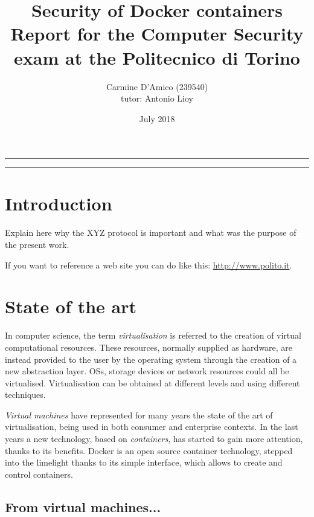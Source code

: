\documentclass[a4paper,12pt]{article}
\begin{document}
\title{Security of Docker containers \\
{\normalsize Report for the Computer Security exam at the Politecnico di Torino}
} \author{Carmine D'Amico (239540) \\
{\normalsize tutor: Antonio Lioy} }
\date{July 2018}
\maketitle

\vfill

\rule{\textwidth}{1pt}

\tableofcontents

\rule{\textwidth}{1pt}

\vfill

\newpage

\section{Introduction}

Explain here why the XYZ protocol is important and what was the purpose of the
present work.

If you want to reference a web site you can do like this:
\url{http://www.polito.it}.

\newpage

\section{State of the art}

In computer science, the term \textit{virtualisation} is referred to the
creation of virtual computational resources. These resources, normally supplied
as hardware, are instead provided to the user by the operating system through
the creation of a new abstraction layer. OSs, storage devices or network
resources could all be virtualised. Virtualisation can be obtained at different
levels and using different techniques. \par\textit{Virtual machines} have
represented for many years the state of the art of virtualisation, being used in
both consumer and enterprise contexts. In the last years a new technology, based
on \textit{containers}, has started to gain more attention, thanks to its
benefits. Docker is an open source container technology, stepped into the
limelight thanks to its simple interface, which allows to create and control
containers. 

\subsection{From virtual machines...}
\end{document}

